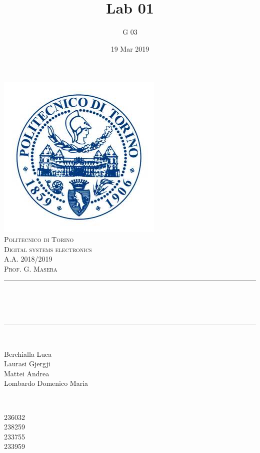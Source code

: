 \documentclass[12pt]{article}
\title{Lab 01}													%
\author{G 03}														%
\date{19 Mar 2019}														%
\makeatletter
\let\thetitle\@title
\let\thedate\@date
\makeatother
\begin{document}

\begin{titlepage}
	\centering
    \vspace*{0.5 cm}
    \includegraphics[scale = 0.75]{polito.jpg}\\[1.0 cm]				%
    \textsc{\LARGE Politecnico di Torino}\\[2.0 cm]						%
	\textsc{\Large Digital systems electronics\\ A.A. 2018/2019}\\[0.5 cm]		%
	\textsc{\Large Prof. G. Masera}\\[0.5 cm]		%
	\rule{\linewidth}{0.2 mm} \\[0.4 cm]
	{ \huge \bfseries \thetitle \\ \small \thedate}\\
	\rule{\linewidth}{0.2 mm} \\[1.5 cm]
	
	\begin{minipage}{0.4\textwidth}
		\begin{flushleft} \large
			Berchialla Luca\\												%
			Laurasi Gjergji
			\\
			
			Mattei Andrea\\
            Lombardo Domenico Maria\\
            
			\end{flushleft}
			\end{minipage}~
			\begin{minipage}{0.4\textwidth}
            
			\begin{flushright} \large
			236032\\													%
			238259\\
            233755\\
            233959\\
            
		\end{flushright}
        
	\end{minipage}\\[2 cm]
	
\end{titlepage}
\end{document}
